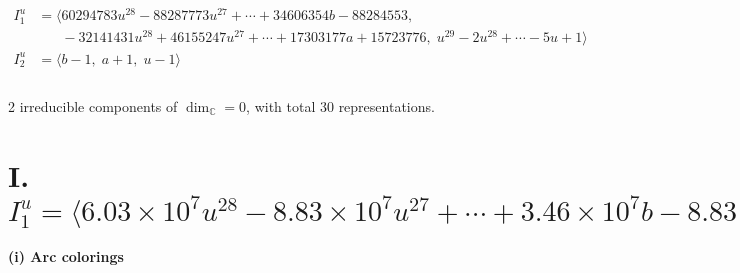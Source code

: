 \documentclass[1p]{elsarticle_modified}
\theoremstyle{definition}
\begin{document}
\begin{align*}
I^u_{1}&=\langle 
60294783 u^{28}-88287773 u^{27}+\cdots+34606354 b-88284553,\\
\phantom{I^u_{1}}&\phantom{= \langle  }-32141431 u^{28}+46155247 u^{27}+\cdots+17303177 a+15723776,\;u^{29}-2 u^{28}+\cdots-5 u+1\rangle \\
I^u_{2}&=\langle 
b-1,\;a+1,\;u-1\rangle \\
\\
\end{align*}
\raggedright * 2 irreducible components of $\dim_{\mathbb{C}}=0$, with total 30 representations.\\
\newpage
\renewcommand{\arraystretch}{1}
\centering \section*{I. $I^u_{1}= \langle 6.03\times10^{7} u^{28}-8.83\times10^{7} u^{27}+\cdots+3.46\times10^{7} b-8.83\times10^{7},\;-3.21\times10^{7} u^{28}+4.62\times10^{7} u^{27}+\cdots+1.73\times10^{7} a+1.57\times10^{7},\;u^{29}-2 u^{28}+\cdots-5 u+1 \rangle$}
\flushleft \textbf{(i) Arc colorings}\\
\end{document}
